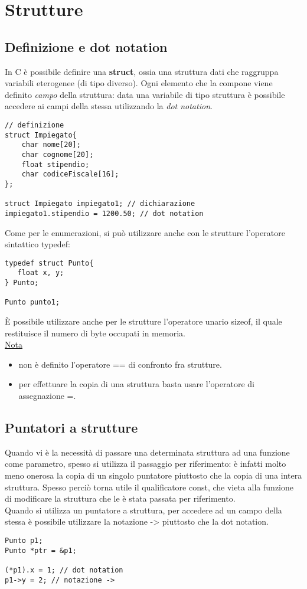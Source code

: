 \section{Strutture}
\subsection{Definizione e dot notation}
In C è possibile definire una \textbf{struct}, ossia una struttura dati che raggruppa variabili eterogenee (di tipo diverso). Ogni elemento che la compone viene definito \textit{campo} della struttura: data una variabile di tipo struttura è possibile accedere ai campi della stessa utilizzando la \textit{dot notation}.
\begin{lstlisting}[title={Esempio di definizione di struttura}]
// definizione
struct Impiegato{
    char nome[20];
    char cognome[20];
    float stipendio;
    char codiceFiscale[16];
};

struct Impiegato impiegato1; // dichiarazione
impiegato1.stipendio = 1200.50; // dot notation
\end{lstlisting}
Come per le enumerazioni, si può utilizzare anche con le strutture l'operatore sintattico \colorbox{light-gray}{typedef}:
\begin{lstlisting}[title={Esempio di definizione di struttura con typedef}]
typedef struct Punto{
   float x, y;
} Punto;

Punto punto1;
\end{lstlisting}
\`{E} possibile utilizzare anche per le strutture l’operatore unario \colorbox{light-gray}{sizeof}, il quale restituisce il numero di byte occupati in memoria.\\
\underline{Nota}
\begin{itemize}[noitemsep]
	\item non è definito l'operatore \colorbox{light-gray}{==} di confronto fra strutture.
	\item per effettuare la copia di una struttura basta usare l'operatore di assegnazione \colorbox{light-gray}{=}.
\end{itemize}

\subsection{Puntatori a strutture}
Quando vi è la necessità di passare una determinata struttura ad una funzione come parametro, spesso si utilizza il passaggio per riferimento: è infatti molto meno onerosa la copia di un singolo puntatore piuttosto che la copia di una intera struttura. Spesso perciò torna utile il qualificatore \colorbox{light-gray}{const}, che vieta alla funzione di modificare la struttura che le è stata passata per riferimento.\\

Quando si utilizza un puntatore a struttura, per accedere ad un campo della stessa è possibile utilizzare la notazione \colorbox{light-gray}{->} piuttosto che la dot notation.
\begin{lstlisting}[title={Accesso ai campi di un puntatore a struttura}]
Punto p1;
Punto *ptr = &p1;

(*p1).x = 1; // dot notation
p1->y = 2; // notazione ->
\end{lstlisting}
